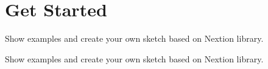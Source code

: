 \hypertarget{group___get_started}{\section{Get Started}
\label{group___get_started}
}


Show examples and create your own sketch based on Nextion library.  


Show examples and create your own sketch based on Nextion library. 

